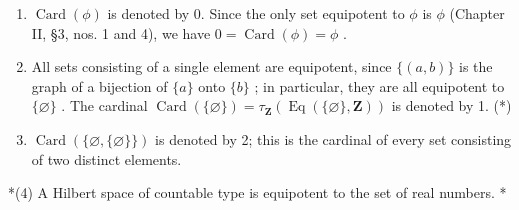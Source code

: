\begin{enumerate}
\def\labelenumi{(\arabic{enumi})}
\item
  \(\operatorname{Card}(\phi)\) is denoted by 0. Since the only set equipotent to \(\phi\) is \(\phi\) (Chapter II, §3, nos. 1 and 4), we have \(0 = \operatorname{Card}(\phi) = \phi\) .
\item
  All sets consisting of a single element are equipotent, since \(\{(a, b)\}\) is the graph of a bijection of \(\{a\}\) onto \(\{b\}\) ; in particular, they are all equipotent to \(\{\varnothing\}\) . The cardinal \(\operatorname{Card}(\{\varnothing\}) = \tau_{\mathbf{Z}}(\operatorname{Eq}(\{\varnothing\}, \mathbf{Z}))\) is denoted by 1. (*)
\item
  \(\operatorname{Card}(\{\varnothing, \{\varnothing\}\})\) is denoted by 2; this is the cardinal of every set consisting of two distinct elements.
\end{enumerate}

*(4) A Hilbert space of countable type is equipotent to the set of real numbers. *


